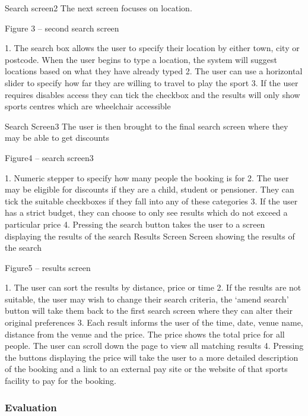 Search screen2
The next screen focuses on location.

Figure 3 – second search screen

1.       The search box allows the user to specify their location by either town, city or postcode. When the user begins to type a location, the system will suggest locations based on what they have already typed
2.       The user can use a horizontal slider to specify how far they are willing to travel to play the sport
3.       If the user requires disables access they can tick the checkbox and the results will only show sports centres which are wheelchair accessible

Search Screen3
The user is then brought to the final search screen where they may be able to get discounts

Figure4 – search screen3

1.       Numeric stepper to specify how many people the booking is for
2.       The user may be eligible for discounts if they are a child, student or pensioner. They can tick the suitable checkboxes if they fall into any of these categories
3.       If the user has a strict budget, they can choose to only see results which do not exceed a  particular price
4.       Pressing the search button takes the user to a screen displaying the results of the search
Results Screen
Screen showing the results of the search

Figure5 – results screen

1.       The user can sort the results by distance, price or time
2.       If the results are not suitable, the user may wish to change their search criteria, the ‘amend search’ button will take them back to the first search screen where they can alter their original preferences
3.       Each result informs the user of the time, date, venue name, distance from the venue and the price. The price shows the total price for all people. The user can scroll down the page to view all matching results
4.       Pressing the buttons displaying the price will take the user to a more detailed description of the booking and a link to an external pay site or the website of that sports facility to pay for the booking.

\subsubsection{Evaluation}

